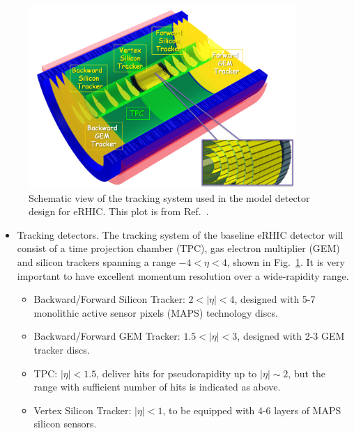 \begin{figure}
\centering
\includegraphics[width=0.9\textwidth]{plots/chpt4/eRHIC_model_tracking.png}
\caption[A schematic view of the tracking system in the eRHIC model detector design]{
Schematic view of the tracking system used in the model detector design for eRHIC. This plot is from Ref.~\cite{Aschenauer:2014a}.}
\label{fig:tracking_eRHIC}
\end{figure}
\begin{itemize}
\item Tracking detectors. The tracking system of the baseline eRHIC detector
will consist of a time projection chamber (TPC), gas electron multiplier (GEM)
and silicon trackers spanning a range $-4<\eta<4$, shown in
Fig.~\ref{fig:tracking_eRHIC}. It is very important to have excellent momentum
resolution over a wide-rapidity range. 
\begin{itemize}
\item Backward/Forward Silicon Tracker: $2<|\eta|<4$, designed with 5-7 
monolithic active sensor pixels (MAPS) technology discs.

\item Backward/Forward GEM Tracker: $1.5<|\eta|<3$, designed with 2-3 GEM tracker discs.

\item TPC: $|\eta|<1.5$, deliver hits for pseudorapidity up to $|\eta|\sim2$, but the
range with sufficient number of hits is indicated as above. 

\item Vertex Silicon Tracker: $|\eta|<1$, to be equipped with 4-6 layers of MAPS silicon sensors.

\end{itemize}

\end{itemize}



